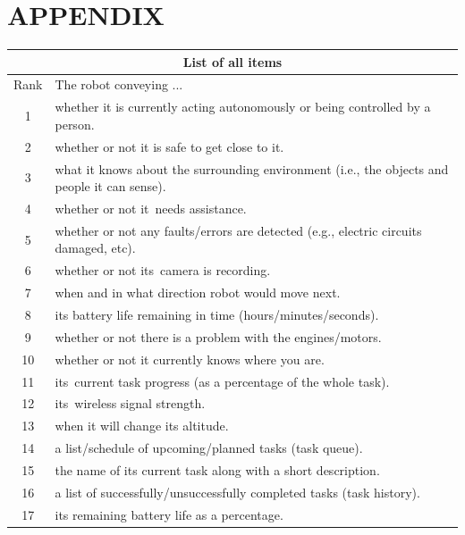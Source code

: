 \documentclass[letterpaper, 10 pt, conference]{ieeeconf}  %
\begin{document}



\section*{APPENDIX}
\begin {table}[h]
\begin{center}
\begin{tabular}{| c | l |}
 \hline
 \multicolumn{2}{|c|}{List of all items} \\
 \hline
 Rank & The robot conveying ... \\
 \hline
1 & whether it is currently acting autonomously or being controlled by a person.\\
\hline
2 &  whether or not it is safe to get close to it.\\
\hline
3 &  what it knows about the surrounding environment (i.e., the objects and people it can sense).\\
\hline
4 &  whether or not it needs assistance.\\
\hline
5 &  whether or not any faults/errors are detected (e.g., electric circuits damaged, etc).\\
\hline
6 &  whether or not its camera is recording.\\
\hline
7 &  when and in what direction robot would move next.\\
\hline
8 &  its battery life remaining in time (hours/minutes/seconds).\\
\hline
9 &  whether or not there is a problem with the engines/motors.\\
\hline
10 &  whether or not it currently knows where you are.\\
\hline
11 &  its current task progress (as a percentage of the whole task).\\
\hline
12 &  its wireless signal strength.\\
\hline
13 &  when it will change its altitude.\\
\hline
14 &  a list/schedule of upcoming/planned tasks (task queue).\\
\hline
15 &  the name of its current task along with a short description.\\
\hline
16 &  a list of successfully/unsuccessfully completed tasks (task history).\\
\hline
17 &  its remaining battery life as a percentage.\\

\end{tabular}
\end{center}
\end{table}
\end{document}
